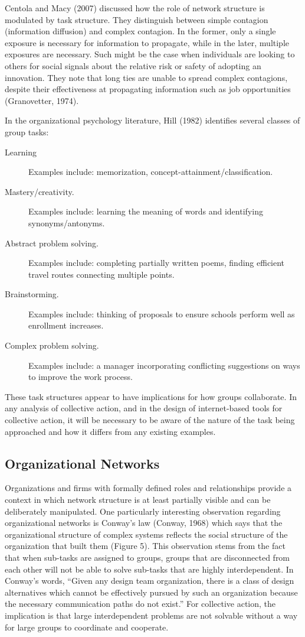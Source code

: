 Centola and Macy (2007) discussed how the role of network structure is modulated by task structure. They distinguish between simple contagion (information diffusion) and complex contagion. In the former, only a single exposure is necessary for information to propagate, while in the later, multiple exposures are necessary. Such might be the case when individuals are looking to others for social signals about the relative risk or safety of adopting an innovation. They note that long ties are unable to spread complex contagions, despite their effectiveness at propagating information such as job opportunities (Granovetter, 1974).

In the organizational psychology literature, Hill (1982) identifies several classes of group tasks:

\begin{description}
\item[Learning]{Examples include: memorization, concept-attainment/classification.}
\item[Mastery/creativity.]{Examples include: learning the meaning of words and identifying synonyms/antonyms.}
\item[Abstract problem solving.]{Examples include: completing partially written poems, finding efficient travel routes connecting multiple points.}
\item[Brainstorming.]{Examples include: thinking of proposals to ensure schools perform well as enrollment increases.}
\item[Complex problem solving.]{Examples include: a manager incorporating conflicting suggestions on ways to improve the work process.}
\end{description}

These task structures appear to have implications for how groups collaborate. In any analysis of collective action, and in the design of internet-based tools for collective action, it will be necessary to be aware of the nature of the task being approached and how it differs from any existing examples.

\subsection{Organizational Networks}
Organizations and firms with formally defined roles and relationships provide a context in which network structure is at least partially visible and can be deliberately manipulated. One particularly interesting observation regarding organizational networks is Conway's law (Conway, 1968) which says that the organizational structure of complex systems reflects the social structure of the organization that built them (Figure 5). This observation stems from the fact that when sub-tasks are assigned to groups, groups that are disconnected from each other will not be able to solve sub-tasks that are highly interdependent. In Conway's words, “Given any design team organization, there is a class of design alternatives which cannot be effectively pursued by such an organization because the necessary communication paths do not exist.” For collective action, the implication is that large interdependent problems are not solvable without a way for large groups to coordinate and cooperate.

